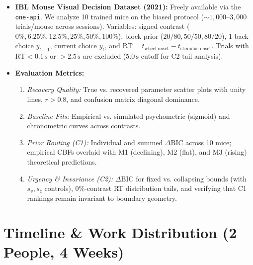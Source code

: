 \documentclass[10pt,a4paper]{article}
\begin{document}
\begin{itemize}
    \item \textbf{IBL Mouse Visual Decision Dataset (2021):} Freely available via the \texttt{one-api}. We analyze 10 trained mice on the biased protocol ($\sim 1{,}000$--$3{,}000$ trials/mouse across sessions). Variables: signed contrast ($0\%, 6.25\%, 12.5\%, 25\%, 50\%, 100\%$), block prior ($20/80, 50/50, 80/20$), 1-back choice $y_{t-1}$, current choice $y_t$, and $\text{RT} = t_{\text{wheel onset}} - t_{\text{stimulus onset}}$. Trials with $\text{RT} < 0.1\,\text{s}$ or $> 2.5\,\text{s}$ are excluded ($5.0\,\text{s}$ cutoff for C2 tail analysis).
    \item \textbf{Evaluation Metrics:}
    \begin{enumerate}
        \item \textit{Recovery Quality:} True vs. recovered parameter scatter plots with unity lines, $r > 0.8$, and confusion matrix diagonal dominance.
        \item \textit{Baseline Fits:} Empirical vs. simulated psychometric (sigmoid) and chronometric curves across contrasts.
        \item \textit{Prior Routing (C1):} Individual and summed $\Delta\text{BIC}$ across 10 mice; empirical CBFs overlaid with M1 (declining), M2 (flat), and M3 (rising) theoretical predictions.
        \item \textit{Urgency \& Invariance (C2):} $\Delta\text{BIC}$ for fixed vs. collapsing bounds (with $s_v, s_z$ controls), 0\%-contrast RT distribution tails, and verifying that C1 rankings remain invariant to boundary geometry.
    \end{enumerate}
\end{itemize}

\section{Timeline \& Work Distribution (2 People, 4 Weeks)}
\end{document}

